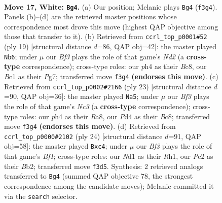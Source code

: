 \documentclass[11pt]{article}
\begin{document}
\clearpage

\begin{figure}[p]\centering
\begin{subfigure}{0.46\textwidth}\centering
\resizebox{\linewidth}{!}{%
\newchessgame
\chessboard[
  setfen={rn2kbnr/4q1p1/2p5/pp1p1QP1/3P3p/5B1P/PPP2P2/R1BN1RK1 w - - 4 17},
  showmover=false,
  pgfstyle=straightmove, color=movearrow, markmove={f3-g4}
]}
\caption{}
\end{subfigure}\hfill
\begin{subfigure}{0.46\textwidth}\centering
\resizebox{\linewidth}{!}{%
\newchessgame
\chessboard[
  setfen={r1b1k2r/pppn1pp1/4pq1p/8/2pPP3/P1P2N2/5PPP/RQ2KB1R b KQkq - 0 10},
  showmover=false,
  pgfstyle=straightmove, color=movearrow, markmove={d7-b6}
]}
\caption{}
\end{subfigure}
\\[4pt]
\begin{subfigure}{0.46\textwidth}\centering
\resizebox{\linewidth}{!}{%
\newchessgame
\chessboard[
  setfen={r1b1kb1r/ppq2ppp/2n1p3/3pP3/5P2/2P1BN2/PP4PP/R2QKB1R b KQkq - 2 12},
  showmover=false,
  pgfstyle=straightmove, color=movearrow, markmove={c6-a5}
]}
\caption{}
\end{subfigure}\hfill
\begin{subfigure}{0.46\textwidth}\centering
\resizebox{\linewidth}{!}{%
\newchessgame
\chessboard[
  setfen={rn2k2r/1pqbnppp/p3p3/4P3/1PpQ4/P4N2/1B3PPP/R3KB1R w KQkq - 0 13},
  showmover=false,
  pgfstyle=straightmove, color=movearrow, markmove={f1-c4}
]}
\caption{}
\end{subfigure}
\caption{\textbf{Move 17, White: \texttt{Bg4}.} (a) Our position; Melanie plays \texttt{Bg4} (\texttt{f3g4}). Panels (b)--(d) are the retrieved master positions whose correspondence most drove this move (highest QAP objective among those that transfer to it). (b) Retrieved from \texttt{ccrl\_top\_p0001\#52} (ply 19) [structural distance $d$=86, QAP obj=42]: the master played \texttt{Nb6}; under $\mu$ our \emph{Bf3} plays the role of that game's \emph{Nd2} (a \textbf{cross-type} correspondence); cross-type roles: our \emph{p}h4 as their \emph{B}c8, our \emph{B}c1 as their \emph{P}g7; transferred move \texttt{f3g4} \textbf{(endorses this move)}. (c) Retrieved from \texttt{ccrl\_top\_p0002\#2166} (ply 23) [structural distance $d$=90, QAP obj=36]: the master played \texttt{Na5}; under $\mu$ our \emph{Bf3} plays the role of that game's \emph{Nc3} (a \textbf{cross-type} correspondence); cross-type roles: our \emph{p}h4 as their \emph{R}a8, our \emph{P}d4 as their \emph{B}c8; transferred move \texttt{f3g4} \textbf{(endorses this move)}. (d) Retrieved from \texttt{ccrl\_top\_p0000\#2102} (ply 24) [structural distance $d$=91, QAP obj=58]: the master played \texttt{Bxc4}; under $\mu$ our \emph{Bf3} plays the role of that game's \emph{Bf1}; cross-type roles: our \emph{N}d1 as their \emph{R}h1, our \emph{P}c2 as their \emph{B}b2; transferred move \texttt{f3d5}. Synthesis: 2 retrieved analogs transferred to \texttt{Bg4} (summed QAP objective 78, the strongest correspondence among the candidate moves); Melanie committed it via the \texttt{search} selector.}
\label{fig:thought-m32}
\end{figure}
\end{document}
